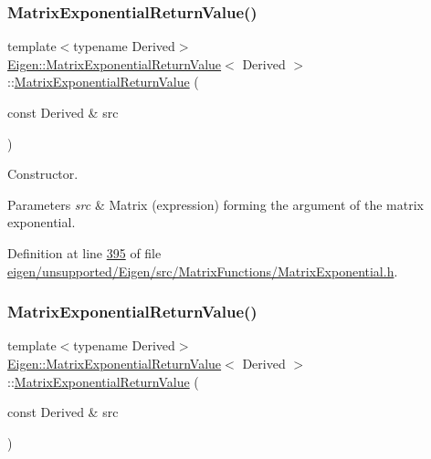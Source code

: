 \subsubsection{\texorpdfstring{Matrix\+Exponential\+Return\+Value()}{MatrixExponentialReturnValue()}\hspace{0.1cm}{\footnotesize\ttfamily [1/2]}}
{\footnotesize\ttfamily template$<$typename Derived$>$ \\
\hyperlink{struct_eigen_1_1_matrix_exponential_return_value}{Eigen\+::\+Matrix\+Exponential\+Return\+Value}$<$ Derived $>$\+::\hyperlink{struct_eigen_1_1_matrix_exponential_return_value}{Matrix\+Exponential\+Return\+Value} (\begin{DoxyParamCaption}\item[{const Derived \&}]{src }\end{DoxyParamCaption})\hspace{0.3cm}{\ttfamily [inline]}}



Constructor. 


\begin{DoxyParams}{Parameters}
{\em src} & Matrix (expression) forming the argument of the matrix exponential. \\
\hline
\end{DoxyParams}


Definition at line \hyperlink{eigen_2unsupported_2_eigen_2src_2_matrix_functions_2_matrix_exponential_8h_source_l00395}{395} of file \hyperlink{eigen_2unsupported_2_eigen_2src_2_matrix_functions_2_matrix_exponential_8h_source}{eigen/unsupported/\+Eigen/src/\+Matrix\+Functions/\+Matrix\+Exponential.\+h}.

\mbox{\label{struct_eigen_1_1_matrix_exponential_return_value_a4048419b1ee2befc51564703ba11acab}} 
\subsubsection{\texorpdfstring{Matrix\+Exponential\+Return\+Value()}{MatrixExponentialReturnValue()}\hspace{0.1cm}{\footnotesize\ttfamily [2/2]}}
{\footnotesize\ttfamily template$<$typename Derived$>$ \\
\hyperlink{struct_eigen_1_1_matrix_exponential_return_value}{Eigen\+::\+Matrix\+Exponential\+Return\+Value}$<$ Derived $>$\+::\hyperlink{struct_eigen_1_1_matrix_exponential_return_value}{Matrix\+Exponential\+Return\+Value} (\begin{DoxyParamCaption}\item[{const Derived \&}]{src }\end{DoxyParamCaption})\hspace{0.3cm}{\ttfamily [inline]}}



